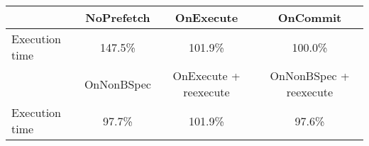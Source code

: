 \begin{tabular}{ l|ccc }
 & NoPrefetch & OnExecute & OnCommit\\ \hline
Execution time & 147.5\% & 101.9\% & 100.0\%\\ \hline
\hline
 & OnNonBSpec & OnExecute + reexecute & OnNonBSpec + reexecute\\ \hline
Execution time & 97.7\% & 101.9\% & 97.6\%\\ \hline
\end{tabular}

